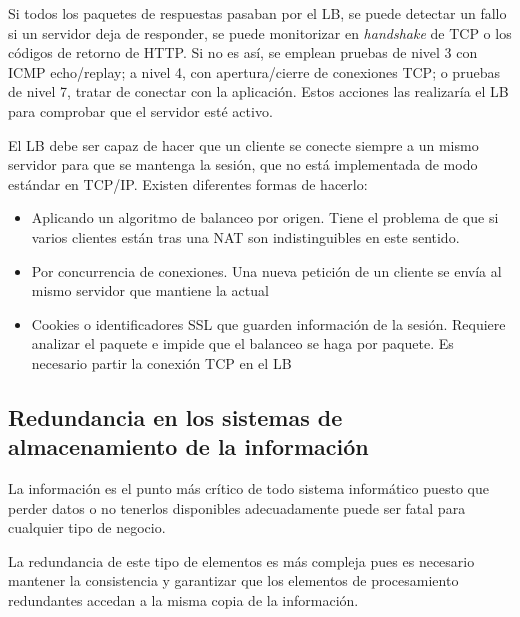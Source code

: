 Si todos los paquetes de respuestas pasaban por el LB, se puede detectar un fallo si un servidor deja de responder, se puede monitorizar en \textit{handshake} de TCP o los códigos de retorno de HTTP. Si no es así, se emplean pruebas de nivel 3 con ICMP echo/replay; a nivel 4, con apertura/cierre de conexiones TCP; o pruebas de nivel 7, tratar de conectar con la aplicación. Estos acciones las realizaría el LB para comprobar que el servidor esté activo.

El LB debe ser capaz de hacer que un cliente se conecte siempre a un mismo servidor para que se mantenga la sesión, que no está implementada de modo estándar en TCP/IP. Existen diferentes formas de hacerlo:
\begin{itemize}
\item Aplicando un algoritmo de balanceo por origen. Tiene el problema de que si varios clientes están tras una NAT son indistinguibles en este sentido.
\item Por concurrencia de conexiones. Una nueva petición de un cliente se envía al mismo servidor que mantiene la actual
\item Cookies o identificadores SSL que guarden información de la sesión. Requiere analizar el paquete e impide que el balanceo se haga por paquete. Es necesario partir la conexión TCP en el LB
\end{itemize}

\subsection{Redundancia en los sistemas de almacenamiento de la información}
La información es el punto más crítico de todo sistema informático puesto que perder datos o no tenerlos disponibles adecuadamente puede ser fatal para cualquier tipo de negocio.

La redundancia de este tipo de elementos es más compleja pues es necesario mantener la consistencia y garantizar que los elementos de procesamiento redundantes accedan a la misma copia de la información.

